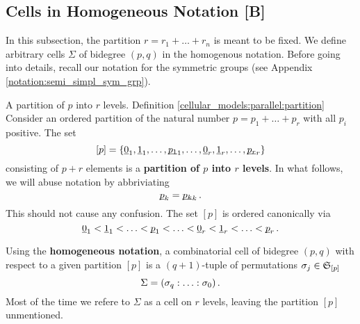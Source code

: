 \subsection{Cells in Homogeneous Notation [B]}
\label{cellular_models:parallel:cells_in_homogenous_notation}
In this subsection, the partition $r = r_1 + \ldots + r_n$ is meant to be fixed.
We define arbitrary cells $\Sigma$ of bidegree $(p,q)$ in the homogenous notation.
Before going into details, recall our notation for the symmetric groups (see Appendix \ref{notation:semi_simpl_sym_grp}).

\begin{defi}
    \label{cellular_models:parallel:partition}
        {A partition of $p$ into $r$ levels.}
        {Definition \ref{cellular_models:parallel:partition}}
    Consider an ordered partition of the natural number $p = p_1+\ldots+p_r$ with all $p_i$ positive.
    The set
    \[
        [p] = \{ \ul 0_1, \ul 1_1, \ldots, \ul{p_1}_1, \ldots, \ul 0_r, \ul 1_r, \ldots, \ul{p_r}_r \}
    \]
    consisting of $p+r$ elements is a {\bf partition of $p$ into $r$ levels}.
    In what follows, we will abuse notation by abbriviating
    \[
        \underline{\smash{p}}_k = \underline{\smash{p_k}}_k \,.
    \]
    This should not cause any confusion.
    The set $[p]$ is ordered canonically via
    \[
        \ul0_1 < \ul1_1 < \ldots < \ul p_1 < \ldots < \ul 0_r < \ul 1_r < \ldots < \ul p_r \,.
    \]
\end{defi}

\begin{defi}
    \label{cellular_models:parallel:homogeneous_notation}
    Using the {\bf homogeneous notation}, a combinatorial cell of bidegree $(p,q)$ with respect to a given partition $[p]$ is a $(q+1)$-tuple of permutations $\sigma_j \in \mathfrak S_{[p]}$
    \[
        \Sigma = \homogq \,.
    \]
    Most of the time we refere to $\Sigma$ as a cell on $r$ levels, leaving the partition $[p]$ unmentioned.
\end{defi}

